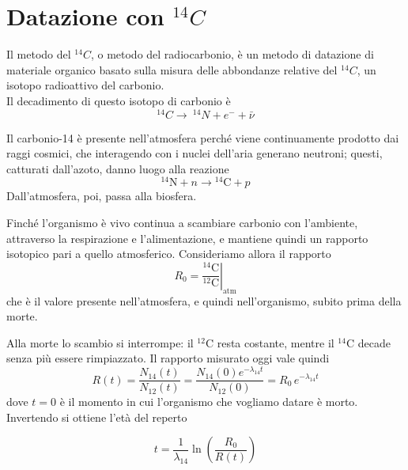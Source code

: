 \newpage

\section{Datazione con $^{14}C$}

Il metodo del $^{14}C$, o metodo del radiocarbonio, è un metodo di datazione di materiale organico basato sulla misura delle abbondanze relative del $^{14}C$, un isotopo radioattivo del carbonio.\\
Il decadimento di questo isotopo di carbonio è 
%
\begin{equation}
    ^{14}C \to \ ^{14}N + e^- + \bar{\nu}
\end{equation}

Il carbonio-14 è presente nell'atmosfera perché viene continuamente prodotto dai raggi cosmici, che interagendo con i nuclei dell'aria generano neutroni; questi, catturati dall'azoto, danno luogo alla reazione
%
\begin{equation*}
    {}^{14}\mathrm{N} + n \longrightarrow {}^{14}\mathrm{C} + p
\end{equation*}
Dall'atmosfera, poi, passa alla biosfera. 

Finché l'organismo è vivo continua a scambiare carbonio con l'ambiente, attraverso la respirazione e l'alimentazione, e mantiene quindi un rapporto isotopico pari a quello atmosferico. Consideriamo allora il rapporto
%
\begin{equation}
    R_0 = \left. \frac{{}^{14}\mathrm{C}}{{}^{12}\mathrm{C}} \right|_{\text{atm}}
\end{equation}
che è il valore presente nell'atmosfera, e quindi nell'organismo, subito prima della morte. 

Alla morte lo scambio si interrompe: il $^{12}\mathrm{C}$ resta costante, mentre il $^{14}\mathrm{C}$ decade senza più essere rimpiazzato. Il rapporto misurato oggi vale quindi
%
\begin{equation}
    R(t) = \frac{N_{14}(t)}{N_{12}(t)} = \frac{N_{14}(0) e^{-\lambda_{14} t}}{N_{12}(0)} = R_0 \, e^{-\lambda_{14} t}
\end{equation}
dove $t = 0$ è il momento in cui l'organismo che vogliamo datare è morto. Invertendo si ottiene l'età del reperto
%
\begin{tcolorbox}[colback=black!5!white, colframe=black!45!white, boxrule=0.8pt]
\begin{equation}
    t = \frac{1}{\lambda_{14}} \ln \left( \frac{R_0}{R(t)} \right)
\end{equation}
\end{tcolorbox}

